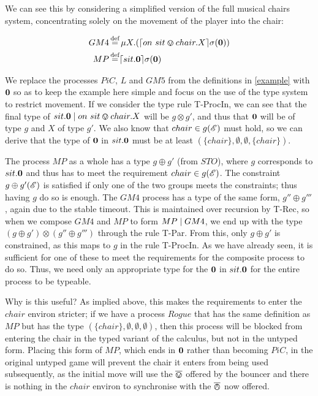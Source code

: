 We can see this by considering a simplified version of the full
musical chairs system, concentrating solely on the movement of the
player into the chair:

\begin{equation}
\begin{aligned}
GM4 & \operatorname{\stackrel{\textrm{def}}{=}} \mu X.(\lceil{on\ sit \varovee chair.X}\rceil {\sigma} ({\textbf{0}})) \\
MP & \operatorname{\stackrel{\textrm{def}}{=}} \lceil{sit.\textbf{0}}\rceil {\sigma} ({\textbf{0}})
\end{aligned}
\end{equation}

\noindent We replace the processes $PiC$, $L$ and $GM5$ from the
definitions in \ref{example} with $\textbf{0}$ so as to keep the example
here simple and focus on the use of the type system to restrict
movement.  If we consider the type rule T-ProcIn, we can see that the
final type of $sit.\textbf{0} \;|\; on\ sit \varovee chair.X$ will be $g \otimes
g'$, and thus that $\textbf{0}$ will be of type $g$ and $X$ of type $g'$.
We also know that $chair \in g(\mathscr{E})$ must hold, so we can derive
that the type of $\textbf{0}$ in $sit.\textbf{0}$ must be at least $(\{chair\},
\emptyset, \emptyset, \{chair\})$.

The process $MP$ as a whole has a type $g \oplus g'$ (from $STO$),
where $g$ corresponds to $sit.\textbf{0}$ and thus has to meet the
requirement $chair \in g(\mathscr{E})$.  The constraint $g \oplus
  g'(\mathscr{E})$ is satisfied if only one of the two groups meets the
constraints; thus having $g$ do so is enough.  The $GM4$ process has a
type of the same form, $g'' \oplus g'''$, again due to the stable
timeout.  This is maintained over recursion by T-Rec, so when we
compose $GM4$ and $MP$ to form $MP \;|\; GM4$, we end up with the type
$(g \oplus g') \otimes (g'' \oplus g''')$ through the rule T-Par.
From this, only $g \oplus g'$ is constrained, as this maps to $g$ in
the rule T-ProcIn.  As we have already seen, it is sufficient for
one of these to meet the requirements for the composite process to do
so.  Thus, we need only an appropriate type for the $\textbf{0}$ in
$sit.\textbf{0}$ for the entire process to be typeable.

Why is this useful? As implied above, this makes the requirements to
enter the $chair$ environ stricter; if we have a process $Rogue$ that
has the same definition as $MP$ but has the type
$(\{chair\},\emptyset,\emptyset,\emptyset)$, then this process will be
blocked from entering the chair in the typed variant of the calculus,
but not in the untyped form.  Placing this form of $MP$, which ends in
$\textbf{0}$ rather than becoming $PiC$, in the original untyped game will
prevent the chair it enters from being used subsequently, as the
initial move will use the $\overline{\varovee}$ offered by the bouncer and there is
nothing in the $chair$ environ to synchronise with the $\overline{\varowedge}$ now
offered.

